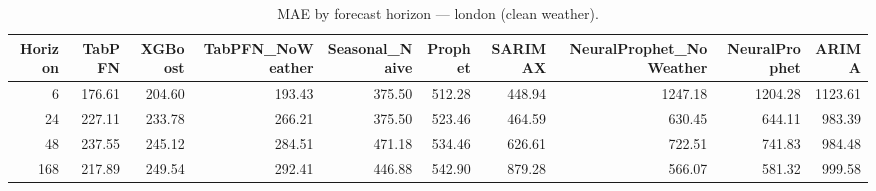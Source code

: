 \begin{table}[ht!]
\centering
\caption{MAE by forecast horizon — london (clean weather).}
\label{tab:mae_by_horizon_london}
\begin{tabular}{rrrrrrrrrr}
\toprule
Horizon & TabPFN & XGBoost & TabPFN_NoWeather & Seasonal_Naive & Prophet & SARIMAX & NeuralProphet_NoWeather & NeuralProphet & ARIMA \\
\midrule
6 & 176.61 & 204.60 & 193.43 & 375.50 & 512.28 & 448.94 & 1247.18 & 1204.28 & 1123.61 \\
24 & 227.11 & 233.78 & 266.21 & 375.50 & 523.46 & 464.59 & 630.45 & 644.11 & 983.39 \\
48 & 237.55 & 245.12 & 284.51 & 471.18 & 534.46 & 626.61 & 722.51 & 741.83 & 984.48 \\
168 & 217.89 & 249.54 & 292.41 & 446.88 & 542.90 & 879.28 & 566.07 & 581.32 & 999.58 \\
\bottomrule
\end{tabular}
\end{table}
